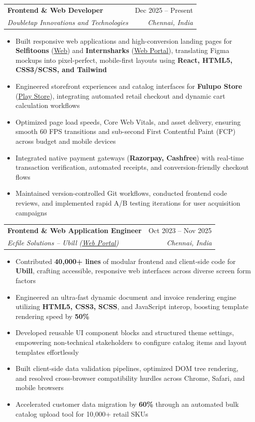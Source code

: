 \documentclass[letterpaper,10pt]{article}
\makeatletter
\newcommand{\resumeItem}[1]{
  \item\small{
    {#1 \vspace{-2pt}}
  }
}
\newcommand{\resumeSubheading}[4]{
  \vspace{-2pt}\item
    \begin{tabular*}{0.97\textwidth}[t]{l@{\extracolsep{\fill}}r}
      \textbf{#1} & #2 \\
      \textit{\small#3} & \textit{\small #4} \\
    \end{tabular*}\vspace{-6pt}
}
\newcommand{\resumeItemListStart}{\begin{itemize}}
\newcommand{\resumeItemListEnd}{\end{itemize}\vspace{-5pt}}
\makeatother
\begin{document}
    \resumeSubheading
      {Frontend \& Web Developer}{Dec 2025 -- Present}
      {Doubletap Innovations and Technologies}{Chennai, India}
      \resumeItemListStart
        \resumeItem{Built responsive web applications and high-conversion landing pages for \textbf{Selfitoons} (\href{https://selfitoons.ai/}{\underline{Web}}) and \textbf{Internsharks} (\href{https://internsharks.ai/}{\underline{Web Portal}}), translating Figma mockups into pixel-perfect, mobile-first layouts using \textbf{React, HTML5, CSS3/SCSS, and Tailwind}}
        \resumeItem{Engineered storefront experiences and catalog interfaces for \textbf{Fulupo Store} (\href{https://play.google.com/store/apps/details?id=com.doubletap.fulupostore}{\underline{Play Store}}), integrating automated retail checkout and dynamic cart calculation workflows}
        \resumeItem{Optimized page load speeds, Core Web Vitals, and asset delivery, ensuring smooth 60 FPS transitions and sub-second First Contentful Paint (FCP) across budget and mobile devices}
        \resumeItem{Integrated native payment gateways (\textbf{Razorpay, Cashfree}) with real-time transaction verification, automated receipts, and conversion-friendly checkout flows}
        \resumeItem{Maintained version-controlled Git workflows, conducted frontend code reviews, and implemented rapid A/B testing iterations for user acquisition campaigns}
      \resumeItemListEnd

    \resumeSubheading
      {Frontend \& Web Application Engineer}{Oct 2023 -- Nov 2025}
      {Ecfile Solutions -- Ubill (\href{https://app.ubill.tech/}{\underline{Web Portal}})}{Chennai, India}
      \resumeItemListStart
        \resumeItem{Contributed \textbf{40,000+ lines} of modular frontend and client-side code for \textbf{Ubill}, crafting accessible, responsive web interfaces across diverse screen form factors}
        \resumeItem{Engineered an ultra-fast dynamic document and invoice rendering engine utilizing \textbf{HTML5, CSS3, SCSS}, and JavaScript interop, boosting template rendering speed by \textbf{50\%}}
        \resumeItem{Developed reusable UI component blocks and structured theme settings, empowering non-technical stakeholders to configure catalog items and layout templates effortlessly}
        \resumeItem{Built client-side data validation pipelines, optimized DOM tree rendering, and resolved cross-browser compatibility hurdles across Chrome, Safari, and mobile browsers}
        \resumeItem{Accelerated customer data migration by \textbf{60\%} through an automated bulk catalog upload tool for 10,000+ retail SKUs}
      \resumeItemListEnd
\end{document}

